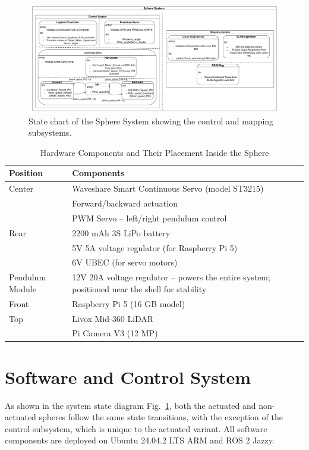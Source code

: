 \documentclass[conference]{IEEEtran}
\begin{document}
\begin{figure}
    \centering
    \includegraphics[width=1\linewidth]{pics/Khonsu.pdf} 
    \caption{State chart of the Sphere System showing the control and mapping subsystems.}
    \label{fig:sphere_system}
\end{figure}

\begin{table}
\centering
\caption{Hardware Components and Their Placement Inside the Sphere}
\label{tab:hardware_components}
\begin{tabularx}{\linewidth}{@{}l X@{}}
\toprule
\textbf{Position} & \textbf{Components} \\
\midrule
Center & Waveshare Smart Continuous Servo (model ST3215) \\
       & Forward/backward actuation \\
       & PWM Servo – left/right pendulum control \\
Rear   & 2200 mAh 3S LiPo battery \\
       & 5V 5A voltage regulator (for Raspberry Pi 5) \\
       & 6V UBEC (for servo motors) \\
Pendulum Module & 12V 20A voltage regulator – powers the entire system; positioned near the shell for stability \\
Front  & Raspberry Pi 5 (16 GB model) \\
Top    & Livox Mid-360 LiDAR \\
       & Pi Camera V3 (12 MP) \\
\bottomrule
\end{tabularx}
\end{table}

\section{Software and Control System}

As shown in the system state diagram Fig.~\ref{fig:sphere_system}, both the actuated and non-actuated spheres follow the same state transitions, with the exception of the control subsystem, which is unique to the actuated variant. 
All software components are deployed on Ubuntu 24.04.2 LTS ARM and ROS 2 Jazzy.
\end{document}
